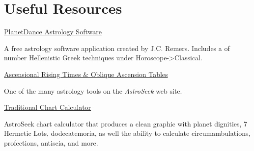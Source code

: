 \section{Useful Resources}

\noindent\href{https://www.jcremers.com/}{PlanetDance Astrology Software}

	A free astrology software application created by J.C. Remers. Includes a of number Hellenistic Greek techniques under Horoscope->Classical.
	
	\noindent\href{https://horoscopes.astro-seek.com/calculate-ascensional-rising-times/?latitude=&narozeni_lat_custom_stupne=0&narozeni_lat_custom_minuty=0&narozeni_lat_custom_smer=0&narozeni_rok=2022&aya=&oa=&decimal=0}{Ascensional Rising Times \& Oblique Ascension Tables}
	
	One of the many astrology tools on the \textsl{AstroSeek} web site.
	
	\noindent\href{https://horoscopes.astro-seek.com/traditional-astrology}{Traditional Chart Calculator}
	
	AstroSeek chart calculator that produces a clean graphic with planet dignities, 7 Hermetic Lots, dodecatemoria, as well the ability to calculate circumambulations, profections, antiscia, and more.
	
\newpage
